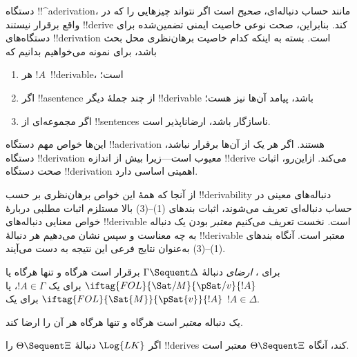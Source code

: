 \documentclass[../../../include/open-logic-section]{subfiles}
\begin{document}
      {}
      {}


\begin{explain}
دستگاه !!^a{derivation}، مانند حساب دنباله‌ای، \emph{صحیح} است اگر
نتواند چیزهایی را که در واقع برقرار نیستند !!{derive} کند. بنابراین،
صحت نوعی خاصیت ایمنی تضمین‌شده برای دستگاه‌های !!{derivation} است.
بسته به اینکه کدام خاصیت برهان‌نظری محل بحث باشد، برای نمونه می‌خواهیم
بدانیم که
\begin{enumerate}
\item هر $!A$~!!{derivable}،  است؛
\item اگر !!a{sentence} از چند جملهٔ دیگر !!{derivable} باشد، پیامد
  آن‌ها نیز هست؛
\item اگر مجموعه‌ای از !!{sentence}s ناسازگار باشد، ارضاناپذیر است.
\end{enumerate}
این‌ها خواص مهم دستگاه !!a{derivation} هستند. اگر هر یک از آن‌ها
برقرار نباشد، دستگاه !!{derivation} معیوب است---زیرا بیش از اندازه
!!{derive} می‌کند. ازاین‌رو، اثبات صحت دستگاه !!{derivation} اهمیتی
اساسی دارد.

از آنجا که همهٔ این خواص برهان‌نظری بر حسب !!{derivability} دنباله‌های
معینی در حساب دنباله‌ای تعریف می‌شوند، اثبات بندهای (1)--(3) بالا مستلزم
اثبات مطلبی دربارهٔ خواص معنایی دنباله‌های !!{derivable} است. نخست تعریف
می‌کنیم \emph{معتبر} بودن یک دنباله به چه معناست و سپس نشان می‌دهیم هر دنبالهٔ
!!{derivable} معتبر است. آنگاه بندهای (1)--(3) به‌عنوان نتایج فرعی این
نتیجه به دست می‌آیند.
\end{explain}

\begin{defn}
برای ، \emph{ارضای} دنبالهٔ
$\Gamma \Sequent \Delta$ برقرار است هرگاه و تنها هرگاه یا
$\iftag{FOL}{\Sat/{M}}{\pSat/{v}}{!A}$ برای یک $!A \in \Gamma$، یا
$\iftag{FOL}{\Sat{M}}{\pSat{v}}{!A}$ برای یک $!A \in \Delta$.

یک دنباله \emph{معتبر} است هرگاه و تنها هرگاه هر
 آن را ارضا کند.
\end{defn}

\begin{thm}[صحت]
 اگر $\Log{LK}$ دنبالهٔ $\Theta
\Sequent \Xi$ را !!{derive}s کند، آنگاه $\Theta \Sequent \Xi$ معتبر است.
\end{thm}
\end{document}
